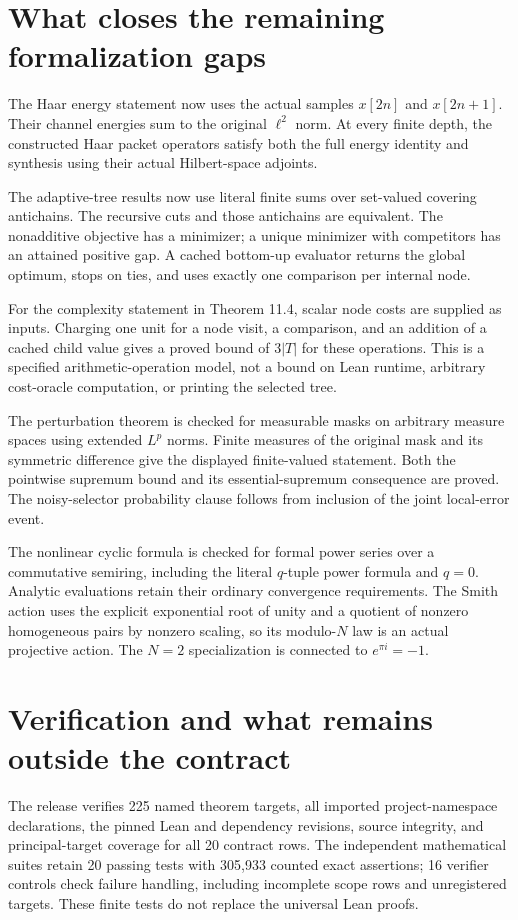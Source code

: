 \documentclass[11pt]{article}
\begin{document}
\section{What closes the remaining formalization gaps}
The Haar energy statement now uses the actual samples $x[2n]$ and $x[2n+1]$. Their channel energies sum to the original $\ell^2$ norm. At every finite depth, the constructed Haar packet operators satisfy both the full energy identity and synthesis using their actual Hilbert-space adjoints.

The adaptive-tree results now use literal finite sums over set-valued covering antichains. The recursive cuts and those antichains are equivalent. The nonadditive objective has a minimizer; a unique minimizer with competitors has an attained positive gap. A cached bottom-up evaluator returns the global optimum, stops on ties, and uses exactly one comparison per internal node.

For the complexity statement in Theorem 11.4, scalar node costs are supplied as inputs. Charging one unit for a node visit, a comparison, and an addition of a cached child value gives a proved bound of $3|T|$ for these operations. This is a specified arithmetic-operation model, not a bound on Lean runtime, arbitrary cost-oracle computation, or printing the selected tree.

The perturbation theorem is checked for measurable masks on arbitrary measure spaces using extended $L^p$ norms. Finite measures of the original mask and its symmetric difference give the displayed finite-valued statement. Both the pointwise supremum bound and its essential-supremum consequence are proved. The noisy-selector probability clause follows from inclusion of the joint local-error event.

The nonlinear cyclic formula is checked for formal power series over a commutative semiring, including the literal $q$-tuple power formula and $q=0$. Analytic evaluations retain their ordinary convergence requirements. The Smith action uses the explicit exponential root of unity and a quotient of nonzero homogeneous pairs by nonzero scaling, so its modulo-$N$ law is an actual projective action. The $N=2$ specialization is connected to $e^{\pi i}=-1$.

\section{Verification and what remains outside the contract}
The release verifies 225 named theorem targets, all imported project-namespace declarations, the pinned Lean and dependency revisions, source integrity, and principal-target coverage for all 20 contract rows. The independent mathematical suites retain 20 passing tests with 305,933 counted exact assertions; 16 verifier controls check failure handling, including incomplete scope rows and unregistered targets. These finite tests do not replace the universal Lean proofs.
\end{document}
